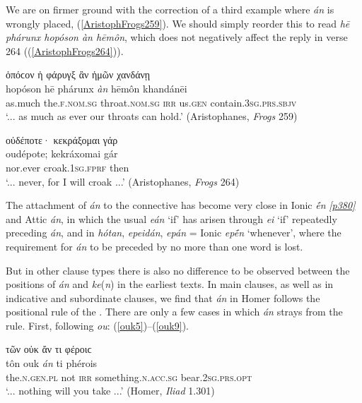 We are on firmer ground with the correction of a third example where \emph{án} is wrongly placed, (\ref{AristophFrogs259}). We should simply reorder this to read \textit{hē phárunx hopóson àn hēmôn}, which does not negatively affect the reply in verse 264 ((\ref{AristophFrogs264})).

\begin{exe}
\ex ὁπόϲον ἡ φάρυγξ ἂν ἡμῶν χανδάνῃ\\
\gll hopóson hē phárunx \emph{àn} hēmôn khandánēi\\
as.much the.\textsc{f.nom.sg} throat.\textsc{nom.sg} \textsc{irr} us.\textsc{gen} contain.\textsc{3sg.prs.sbjv}\\
\trans `... as much as ever our throats can hold.' (Aristophanes, \textit{Frogs} 259)
\label{AristophFrogs259}
\end{exe}

\begin{exe}
\ex οὐδέποτε· κεκράξομαι γάρ\\
\gll oudépote; kekráxomai gár\\
nor.ever croak.\textsc{1sg.fprf} then\\
\trans `... never, for I will croak ...' (Aristophanes, \textit{Frogs} 264)
\label{AristophFrogs264}
\end{exe}

The attachment of \textit{án} to the connective has become very close in Ionic \textit{ḗn} \hyperlink{p380}{\emph{[p380]}} and Attic \textit{án}, in which the usual \textit{eán} `if' has arisen through \textit{ei} `if' repeatedly preceding \emph{án}, and in \textit{hótan}, \textit{epeidán}, \textit{epán} = Ionic \textit{epḗn} `whenever', where the requirement for \emph{án} to be preceded by no more than one word is lost.

But in other clause types there is also no difference to be observed between the positions of \textit{án} and \textit{ke}(\textit{n}) in the earliest texts. In main clauses, as well as in indicative and  subordinate clauses, we find that \textit{án} in Homer follows the positional rule of the . There are only a few cases in which \textit{án} strays from the rule. First, following \textit{ou}: (\ref{ouk5})--(\ref{ouk9}).\label{ouk4}

\begin{exe}
\ex τῶν οὐκ ἄν τι φέροιϲ\\
\gll tôn ouk \emph{án} ti phérois\\
the.\textsc{n.gen.pl} not \textsc{irr} something.\textsc{n.acc.sg}
bear.\textsc{2sg.prs.opt}\\
\trans `... nothing will you take ...' (Homer, \textit{Iliad} 1.301)
\label{ouk5}
\end{exe}

